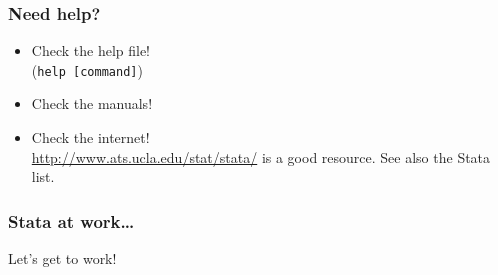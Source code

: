 \documentclass[pdftex, compress]{beamer}
\begin{document}
\begin{frame}
	\frametitle{Need help?}
	\begin{itemize}
		\item Check the help file! \\ (\texttt{help [command]})
		\item Check the manuals!
		\item Check the internet!\\\url{http://www.ats.ucla.edu/stat/stata/} is a good resource. See also the Stata list.
	\end{itemize}
\end{frame}

\begin{frame}
\frametitle{Stata at work\dots}
\Huge Let's get to work!
\end{frame}

\end{document}
